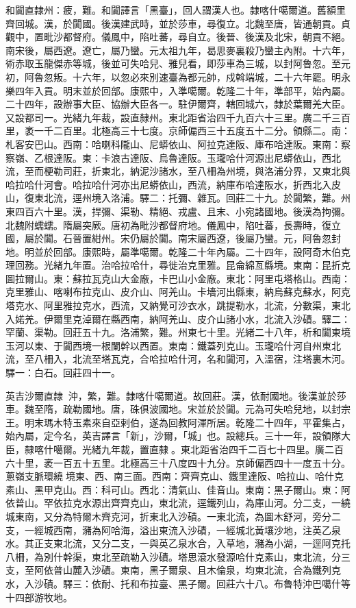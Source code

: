 \begin{pinyinscope}
和闐直隸州：疲，難。和闐譯言「黑臺」，回人謂漢人也。隸喀什噶爾道。舊額里齊回城。漢，於闐國。後漢建武時，並於莎車，尋復立。北魏至唐，皆通朝貢。貞觀中，置毗沙都督府。儀鳳中，陷吐蕃，尋自立。後晉、後漢及北宋，朝貢不絕。南宋後，屬西遼。遼亡，屬乃蠻。元太祖九年，曷思麥裏殺乃蠻主內附。十六年，術赤取玉龍傑赤等城，後並可失哈兒、雅兒看，即莎車為三城，以封阿魯忽。至元初，阿魯忽叛。十六年，以忽必來別速臺為都元帥，戍斡端城，二十六年罷。明永樂四年入貢。明末並於回部。康熙中，入準噶爾。乾隆二十年，準部平，始內屬。二十四年，設辦事大臣、協辦大臣各一。駐伊爾齊，轄回城六，隸於葉爾羌大臣。又設都司一。光緒九年裁，設直隸州。東北距省治四千九百六十三里。廣二千三百里，袤一千二百里。北極高三十七度。京師偏西三十五度五十二分。領縣二。南：札客安巴山。西南：哈喇科隴山、尼蟒依山、阿拉克達阪、庫布哈達阪。東南：察察嶺、乙根達阪。東：卡浪古達阪、烏魯達阪。玉瓏哈什河源出尼蟒依山，西北流，至而梗勒司莊，折東北，納泥沙諸水，至八柵為州境，與洛浦分界，又東北與哈拉哈什河會。哈拉哈什河亦出尼蟒依山，西流，納庫布哈達阪水，折西北入皮山，復東北流，逕州境入洛浦。驛二：托彌、雜瓦。回莊二十九。於闐繁，難。州東四百六十里。漢，捍彌、渠勒、精絕、戎盧、且末、小宛諸國地。後漢為拘彌。北魏附蠕蠕。隋屬突厥。唐初為毗沙都督府地。儀鳳中，陷吐蕃，長壽時，復立國，屬於闐。石晉置紺州。宋仍屬於闐。南宋屬西遼，後屬乃蠻。元，阿魯忽封地。明並於回部。康熙時，屬準噶爾。乾隆二十年內屬。二十四年，設阿奇木伯克理回務。光緒九年置。治哈拉哈什，尋徙治克里雅。昆侖綿亙縣境。東南：昆折克圖拉爾山。東：蘇拉瓦克山大金廠，卡巴山小金廠。東北：阿里屯塔格山。西南：克里雅山、喀喇布拉克山、皮介山、阿羌山。卡墻河出縣東，納烏蘇克蘇水，阿克塔克水、阿里雅拉克水，西流，又納覺可沙衣水，跳提勒水，北流，分數渠，東北入婼羌。伊爾里克淖爾在縣西南，納阿羌山、皮介山諸小水，北流入沙磧。驛二：罕蘭、渠勒。回莊五十九。洛浦繁，難。州東七十里。光緒二十八年，析和闐東境玉河以東、于闐西境一根闌幹以西置。東南：鐵蓋列克山。玉瓏哈什河自州東北流，至八柵入，北流至塔瓦克，合哈拉哈什河，名和闐河，入溫宿，注塔裏木河。驛一：白石。回莊四十一。

英吉沙爾直隸：沖，繁，難。隸喀什噶爾道。故回莊。漢，依耐國地。後漢並於莎車。魏至隋，疏勒國地。唐，硃俱波國地。宋並於於闐。元為可失哈兒地，以封宗王。明末瑪木特玉素來自亞剌伯，遂為回教阿渾所居。乾隆二十四年，平霍集占，始內屬，定今名，英吉譯言「新」，沙爾，「城」也。設總兵。三十一年，設領隊大臣，隸喀什噶爾。光緒九年裁，置直隸。東北距省治四千二百七十四里。廣二百六十里，袤一百五十五里。北極高三十八度四十九分。京師偏西四十一度五十分。蔥嶺支脈環繞境東、西、南三面。西南：齊齊克山、鐵里達阪、哈拉山、哈什克素山、黑甲克山。西：科可山。西北：清氣山、佳音山。東南：黑子爾山。東：阿依普山。罕依拉克水源出齊齊克山，東北流，逕鐵列山，為庫山河。分二支，一繞城東南，又分為特爾木齊克河，折東北入沙磧。一東北流，為圖木舒河，旁分二支，一經城西南，瀦為阿哈海，溢出東流入沙磧，一經城北黃壤沙地，注英乙泉水。其正支東北流，又分二支，一與英乙泉水合，入草地，瀦為小湖，一逕阿克托八柵，為別什幹渠，東北至疏勒入沙磧。塔思滾水發源哈什克素山，東北流，分三支，至阿依普山麓入沙磧。東南，黑子爾泉、且木倫泉，均東北流，合為鐵列克水，入沙磧。驛三：依耐、托和布拉臺、黑子爾。回莊六十八。布魯特沖巴噶什等十四部游牧地。


\end{pinyinscope}